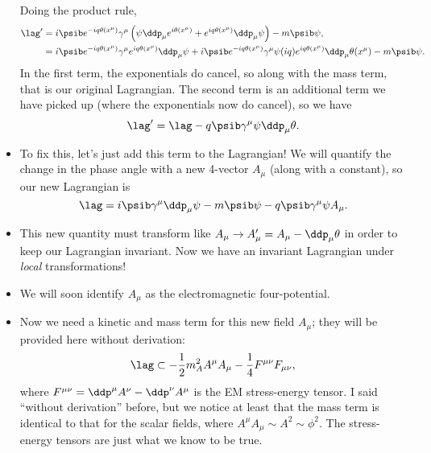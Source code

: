 \begin{itemize}
\begin{equation*}
        \end{equation*}
        Doing the product rule,
        \begin{align*}
            \lag' &= i\psib e^{-iq\theta(x^{\mu})} \gamma^{\mu} \left( \psi \ddp_{\mu}e^{i\theta(x^{\mu})} + e^{iq\theta(x^{\mu})} \ddp_{\mu}\psi \right)  - m\psib\psi, \\
            &= i\psib e^{-iq\theta(x^{\mu})} \gamma^{\mu} e^{iq\theta(x^{\mu})} \ddp_{\mu} \psi + i\psib e^{-iq\theta(x^{\mu})} \gamma^{\mu} \psi (iq) e^{iq\theta(x^{\mu})}\ddp_{\mu}\theta(x^{\mu}) - m\psib\psi.
        \end{align*}
        In the first term, the exponentials do cancel, so along with the mass term, that is our original Lagrangian. The second term is an additional term we have picked up (where the exponentials now do cancel), so we have
        \begin{equation*}
            \lag' = \lag - q\psib\gamma^{\mu}\psi\ddp_{\mu}\theta.
        \end{equation*}
    \item To fix this, let's just add this term to the Lagrangian! We will quantify the change in the phase angle with a new 4-vector $A_{\mu}$ (along with a constant), so our new Lagrangian is
        \begin{equation*}
            \lag = i\psib \gamma^{\mu}\ddp_{\mu} \psi - m\psib\psi - q\psib\gamma^{\mu}\psi A_{\mu}.
        \end{equation*}
    \item This new quantity must transform like $A_{\mu} \rightarrow A_{\mu}' = A_{\mu} - \ddp_{\mu}\theta$ in order to keep our Lagrangian invariant. Now we have an invariant Lagrangian under \textit{local} transformations!
    \item We will soon identify $A_{\mu}$ as the electromagnetic four-potential.
    \item Now we need a kinetic and mass term for this new field $A_{\mu}$; they will be provided here without derivation:
        \begin{equation*}
            \lag \subset -\frac{1}{2}m_A^2 A^{\mu}A_{\mu} - \frac{1}{4}F^{\mu\nu}F_{\mu\nu},
        \end{equation*}
        where $F^{\mu\nu} = \ddp^{\mu}A^{\nu} - \ddp^{\nu}A^{\mu}$ is the EM stress-energy tensor. I said ``without derivation'' before, but we notice at least that the mass term is identical to that for the scalar fields, where $A^{\mu}A_{\mu} \sim A^2 \sim \phi^2$. The stress-energy tensors are just what we know to be true.

\end{itemize}

